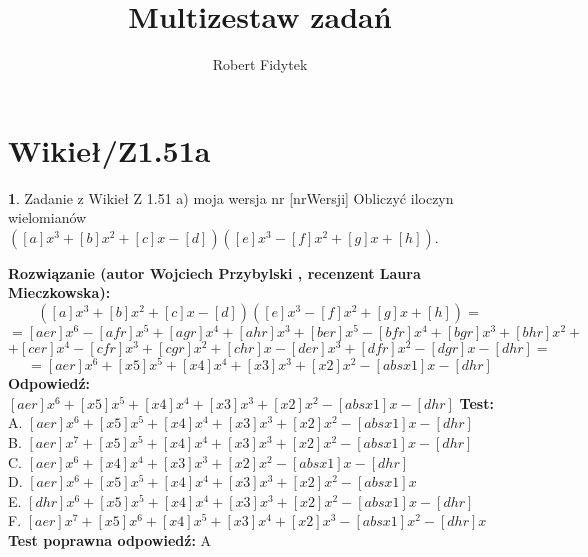 \documentclass[12pt, a4paper]{article}
\title{Multizestaw zadań}
\author{Robert Fidytek}
\date{}
\theoremstyle{definition} %
\newtheorem{zad}{}
\newcommand{\kategoria}[1]{\section{#1}} %
\newcommand{\zadStart}[1]{\begin{zad}#1\newline} %
\newcommand{\zadStop}{\end{zad}}   %
\newcommand{\rozwStart}[2]{\noindent \textbf{Rozwiązanie (autor #1 , recenzent #2): }\newline} %
\newcommand{\rozwStop}{\newline}                                            %
\newcommand{\odpStart}{\noindent \textbf{Odpowiedź:}\newline}    %
\newcommand{\odpStop}{\newline}                                             %
\newcommand{\testStart}{\noindent \textbf{Test:}\newline} %
\newcommand{\testStop}{\newline} %
\newcommand{\kluczStart}{\noindent \textbf{Test poprawna odpowiedź:}\newline} %
\newcommand{\kluczStop}{\newline} %
\begin{document}
\maketitle


\kategoria{Wikieł/Z1.51a}
\zadStart{Zadanie z Wikieł Z 1.51 a) moja wersja nr [nrWersji]}
Obliczyć iloczyn wielomianów $([a]x^{3}+[b]x^{2}+[c]x-[d])([e]x^{3}-[f]x^{2}+[g]x+[h])$.
\zadStop
\rozwStart{Wojciech Przybylski}{Laura Mieczkowska}
$$([a]x^{3}+[b]x^{2}+[c]x-[d])([e]x^{3}-[f]x^{2}+[g]x+[h])=$$
$$=[aer]x^{6}-[afr]x^{5}+[agr]x^{4}+[ahr]x^{3}+[ber]x^{5}-[bfr]x^{4}+[bgr]x^{3}+[bhr]x^{2}+$$
$$+[cer]x^{4}-[cfr]x^{3}+[cgr]x^{2}+[chr]x-[der]x^{3}+[dfr]x^{2}-[dgr]x-[dhr]=$$
$$=[aer]x^{6}+[x5]x^{5}+[x4]x^{4}+[x3]x^{3}+[x2]x^{2}-[absx1]x-[dhr]$$
\rozwStop
\odpStart
$[aer]x^{6}+[x5]x^{5}+[x4]x^{4}+[x3]x^{3}+[x2]x^{2}-[absx1]x-[dhr]$
\odpStop
\testStart
A. $[aer]x^{6}+[x5]x^{5}+[x4]x^{4}+[x3]x^{3}+[x2]x^{2}-[absx1]x-[dhr]$\\
B. $[aer]x^{7}+[x5]x^{5}+[x4]x^{4}+[x3]x^{3}+[x2]x^{2}-[absx1]x-[dhr]$\\
C. $[aer]x^{6}+[x4]x^{4}+[x3]x^{3}+[x2]x^{2}-[absx1]x-[dhr]$\\
D. $[aer]x^{6}+[x5]x^{5}+[x4]x^{4}+[x3]x^{3}+[x2]x^{2}-[absx1]x$\\
E. $[dhr]x^{6}+[x5]x^{5}+[x4]x^{4}+[x3]x^{3}+[x2]x^{2}-[absx1]x-[dhr]$\\
F. $[aer]x^{7}+[x5]x^{6}+[x4]x^{5}+[x3]x^{4}+[x2]x^{3}-[absx1]x^{2}-[dhr]x$
\testStop
\kluczStart
A
\kluczStop
\end{document}

